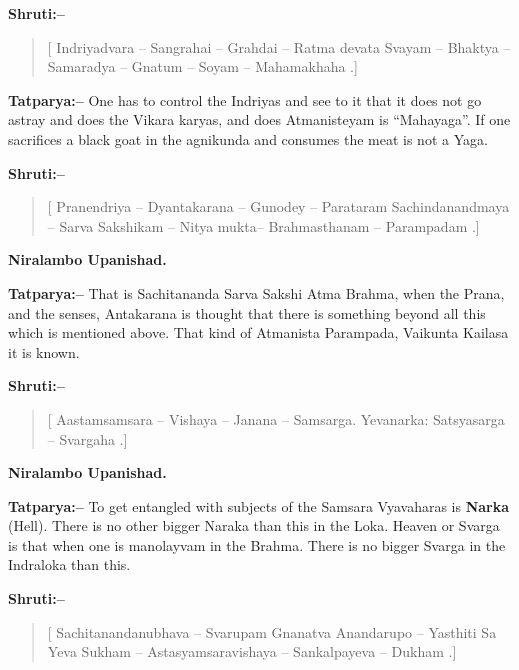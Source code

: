 \textbf{Shruti:–}

\begin{verse}
[ Indriyadvara – Sangrahai – Grahdai – Ratma devata  Svayam – Bhaktya – Samaradya – Gnatum – Soyam – Mahamakhaha .]
\end{verse}

\textbf{Tatparya:–} One has to control the Indriyas and see to it that it does not go astray and does the Vikara karyas, and does Atmanisteyam is “Mahayaga”. If one sacrifices a black goat in the agnikunda and consumes the meat is not a Yaga.

\textbf{Shruti:–}

\begin{verse}
[ Pranendriya – Dyantakarana – Gunodey – Parataram  Sachindanandmaya – Sarva Sakshikam – Nitya mukta– Brahmasthanam – Parampadam .]
\end{verse}

\begin{flushright}
\textbf{Niralambo Upanishad.}
\end{flushright}

\textbf{Tatparya:–} That is Sachitananda Sarva Sakshi Atma Brahma, when the Prana, and the senses, Antakarana is thought that there is something beyond all this which is mentioned above. That kind of Atmanista Parampada, Vaikunta Kailasa it is known.

\textbf{Shruti:–}

\begin{verse}
[ Aastamsamsara – Vishaya – Janana – Samsarga. Yevanarka:  Satsyasarga – Svargaha .]
\end{verse}

\begin{flushright}
\textbf{Niralambo Upanishad.}
\end{flushright}

\textbf{Tatparya:–} To get entangled with subjects of the Samsara Vyavaharas is \textbf{Narka} (Hell). There is no other bigger Naraka than this in the Loka. Heaven or Svarga is that when one is manolayvam in the Brahma. There is no bigger Svarga in the Indraloka than this.

\textbf{Shruti:–}

\begin{verse}
[ Sachitanandanubhava – Svarupam Gnanatva Anandarupo – Yasthiti  Sa Yeva Sukham – Astasyamsaravishaya – Sankalpayeva – Dukham .]
\end{verse}

